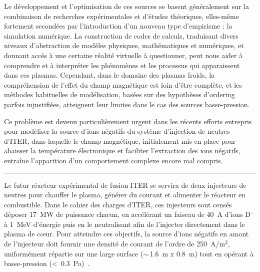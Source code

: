 \begin{refsection}
Le développement et l'optimisation de ces sources se basent généralement sur la
combinaison de recherches expérimentales et d'études théoriques, elles-même
fortement secondées par l'introduction d'un nouveau type d'empirisme : la
simulation numérique.
La construction de codes de calculs, traduisant divers niveaux d'abstraction de
modèles physiques, mathématiques et numériques, et donnant accès à une
certaine réalité virtuelle à questionner, peut nous aider à
comprendre et à interpréter les phénomènes et les processus qui apparaissent dans ces
plasmas. Cependant, dans le domaine des plasmas froids, la compréhension de
l'effet du champ magnétique est loin d'être complète, et les méthodes
habituelles de modélisation, basées sur des hypothèses d'ordering parfois
injustifiées, atteignent leur limites dans le cas des sources basse-pression. 

Ce
problème est devenu particulièrement urgent dans les récents efforts entrepris pour modéliser
la source d'ions négatifs du système d'injection de neutres d'ITER, dans
laquelle le champ magnétique, initialement mis en place pour abaisser la
température électronique et faciliter l'extraction des ions négatifs, entraîne
l'apparition d'un comportement complexe encore mal compris.

\begin{center}
\rule{0.6\textwidth}{1pt}
\end{center}

Le futur réacteur expérimental de fusion ITER se servira de deux injecteurs de
neutres pour chauffer le plasma, générer du courant et alimenter le réacteur en
combustible. Dans le cahier des charges d'ITER, ces injecteurs
sont censés déposer 17~MW de puissance chacun, en accélérant un
faiseau de 40~A d'ions D$^-$ à 1~MeV d'énergie puis en le neutralisant afin de
l'injecter directement dans le plasma de c\oe ur. 
Pour atteindre ces objectifs,
la source d'ions négatifs en amont de l'injecteur doit fournir
une densité de courant de l'ordre de 250~A/m$^2$, uniformément répartie sur une
large surface ($\sim\,$1.6~m x 0.8~m) tout en opérant à
basse-pression (<~0.3~Pa)~\parencite{SimoninHDR}. 


\end{refsection}
